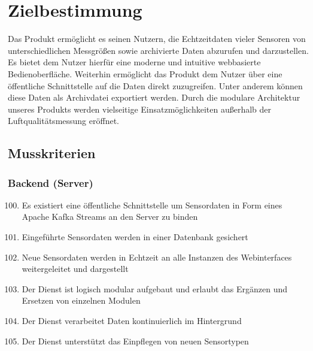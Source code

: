 \chapter{Zielbestimmung}
Das Produkt ermöglicht es seinen Nutzern, die Echtzeitdaten vieler Sensoren von unterschiedlichen Messgrößen sowie archivierte Daten abzurufen und darzustellen. Es bietet dem Nutzer hierfür eine moderne und intuitive webbasierte Bedienoberfläche. Weiterhin ermöglicht das Produkt dem Nutzer über eine öffentliche Schnittstelle auf die Daten direkt zuzugreifen. Unter anderem können diese Daten als Archivdatei exportiert werden. Durch die modulare Architektur unseres Produkts werden vielseitige Einsatzmöglichkeiten außerhalb der Luftqualitätsmessung eröffnet.
\section{Musskriterien}
\subsection{Backend (Server)}
\begin{enumerate}[label=\textbf{MK\arabic{enumi}0}]
	\setcounter{enumi}{99}
	\item Es existiert eine öffentliche Schnittstelle um Sensordaten in Form eines Apache Kafka Streams an den Server zu binden
	\item Eingeführte Sensordaten werden in einer Datenbank gesichert
	\item Neue Sensordaten werden in Echtzeit an alle Instanzen des Webinterfaces weitergeleitet und dargestellt
	\item Der Dienst ist logisch modular aufgebaut und erlaubt das Ergänzen und Ersetzen von einzelnen Modulen
	\item Der Dienst verarbeitet Daten kontinuierlich im Hintergrund
	\item Der Dienst unterstützt das Einpflegen von neuen Sensortypen
\end{enumerate}

